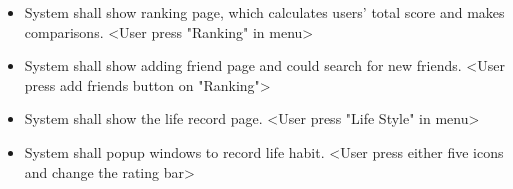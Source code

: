\begin{itemize}
\item System shall show ranking page, which calculates users' total score and makes comparisons. \textless User press "Ranking" in menu\textgreater 
\item System shall show adding friend page and could search for new friends. \textless User press add friends button on "Ranking"\textgreater 
\item System shall show the life record page. \textless User press "Life Style" in menu\textgreater 
\item System shall popup windows to record life habit. \textless User press either five icons and change the rating bar\textgreater 

\end{itemize} 
